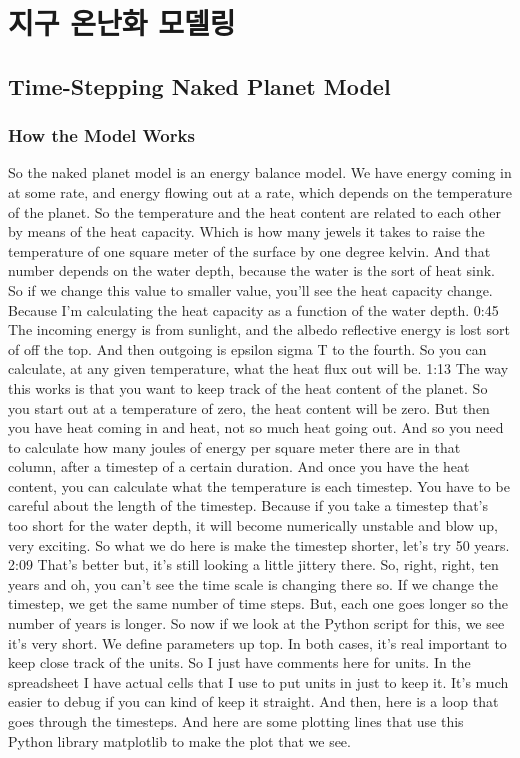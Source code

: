 \chapter{지구 온난화 모델링}

\section{Time-Stepping Naked Planet Model}

\subsection{How the Model Works}\index{}

So the naked planet model is an energy balance model. We have energy coming in at some rate, and energy flowing out at a rate, which depends on the temperature of the planet. So the temperature and the heat content are related to each other by means of the heat capacity. Which is how many jewels it takes to raise the temperature of one square meter of the surface by one degree kelvin. And that number depends on the water depth, because the water is the sort of heat sink. So if we change this value to smaller value, you'll see the heat capacity change. Because I'm calculating the heat capacity as a function of the water depth. 
0:45
The incoming energy is from sunlight, and the albedo reflective energy is lost sort of off the top. And then outgoing is epsilon sigma T to the fourth. So you can calculate, at any given temperature, what the heat flux out will be. 
1:13
The way this works is that you want to keep track of the heat content of the planet. So you start out at a temperature of zero, the heat content will be zero. But then you have heat coming in and heat, not so much heat going out. And so you need to calculate how many joules of energy per square meter there are in that column, after a timestep of a certain duration. And once you have the heat content, you can calculate what the temperature is each timestep. You have to be careful about the length of the timestep. Because if you take a timestep that's too short for the water depth, it will become numerically unstable and blow up, very exciting. So what we do here is make the timestep shorter, let's try 50 years. 
2:09
That's better but, it's still looking a little jittery there. So, right, right, ten years and oh, you can't see the time scale is changing there so. If we change the timestep, we get the same number of time steps. But, each one goes longer so the number of years is longer. So now if we look at the Python script for this, we see it's very short. We define parameters up top. In both cases, it's real important to keep close track of the units. So I just have comments here for units. In the spreadsheet I have actual cells that I use to put units in just to keep it. It's much easier to debug if you can kind of keep it straight. And then, here is a loop that goes through the timesteps. And here are some plotting lines that use this Python library matplotlib to make the plot that we see. 


